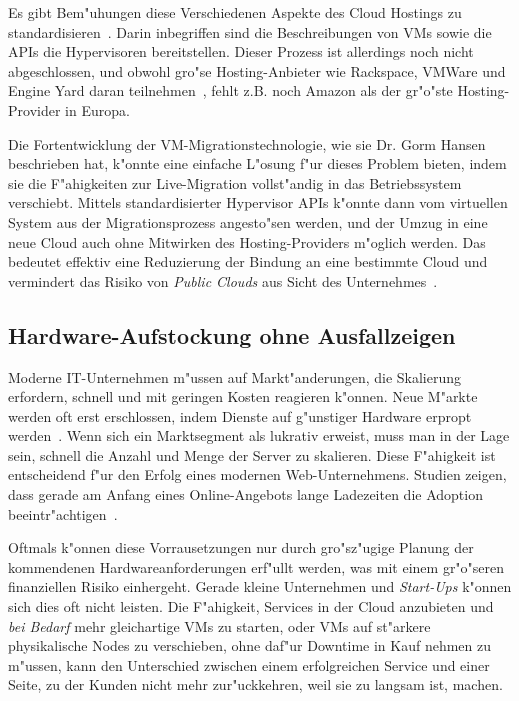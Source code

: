 \documentclass[draft,journal]{IEEEtran}
\begin{document}
Es gibt Bem"uhungen diese Verschiedenen Aspekte des Cloud Hostings zu
standardisieren~\cite{cloudstandard}. Darin inbegriffen sind die
Beschreibungen von VMs sowie die APIs die Hypervisoren
bereitstellen. Dieser Prozess ist allerdings noch nicht abgeschlossen,
und obwohl gro"se Hosting-Anbieter wie Rackspace, VMWare und Engine
Yard daran teilnehmen~\cite{none}, fehlt z.B. noch Amazon als der
gr"o"ste Hosting-Provider in Europa.

Die Fortentwicklung der VM-Migrationstechnologie, wie sie
Dr. Gorm Hansen beschrieben hat, k"onnte eine einfache L"osung f"ur
dieses Problem bieten, indem sie die F"ahigkeiten zur Live-Migration
vollst"andig in das Betriebssystem verschiebt. Mittels
standardisierter Hypervisor APIs k"onnte dann vom virtuellen System
aus der Migrationsprozess angesto"sen werden, und der Umzug in eine
neue Cloud auch ohne Mitwirken des Hosting-Providers m"oglich
werden. Das bedeutet effektiv eine Reduzierung der Bindung an eine
bestimmte Cloud und vermindert das Risiko von \emph{Public Clouds} aus
Sicht des Unternehmes~\cite{none}.

\subsection{Hardware-Aufstockung ohne Ausfallzeigen}
Moderne IT-Unternehmen m"ussen auf Markt"anderungen, die Skalierung
erfordern, schnell und mit geringen Kosten reagieren k"onnen. Neue
M"arkte werden oft erst erschlossen, indem Dienste auf g"unstiger
Hardware erpropt werden~\cite{tanenbaum1992modern}. Wenn sich ein
Marktsegment als lukrativ erweist, muss man in der Lage sein, schnell
die Anzahl und Menge der Server zu skalieren. Diese F"ahigkeit ist
entscheidend f"ur den Erfolg eines modernen Web-Unternehmens. Studien
zeigen, dass gerade am Anfang eines Online-Angebots lange Ladezeiten
die Adoption beeintr"achtigen~\cite{kohavi2007online}.

Oftmals k"onnen diese Vorrausetzungen nur durch gro"sz"ugige Planung
der kommendenen Hardwareanforderungen erf"ullt werden, was mit einem
gr"o"seren finanziellen Risiko einhergeht. Gerade kleine Unternehmen
und \emph{Start-Ups} k"onnen sich dies oft nicht leisten. Die
F"ahigkeit, Services in der Cloud anzubieten und \emph{bei Bedarf}
mehr gleichartige VMs zu starten, oder VMs auf st"arkere physikalische
Nodes zu verschieben, ohne daf"ur Downtime in Kauf nehmen zu m"ussen,
kann den Unterschied zwischen einem erfolgreichen Service und einer
Seite, zu der Kunden nicht mehr zur"uckkehren, weil sie zu langsam
ist, machen.
\end{document}
